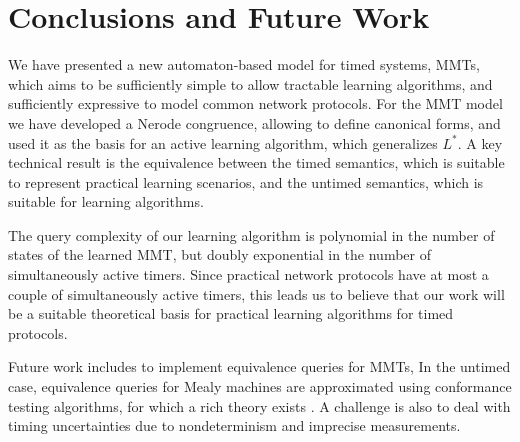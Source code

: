 
\section{Conclusions and Future Work}
\label{conclusions}

We have presented a new automaton-based model for timed systems, MMTs,
which aims to
be sufficiently simple to allow tractable learning algorithms, and sufficiently
expressive to model common network protocols. For the MMT model we have
developed a Nerode congruence, allowing to define canonical forms, and used it
as the basis for an active learning algorithm, which generalizes $L^*$.
A key technical result is the equivalence between the timed semantics,
which is suitable to represent practical learning scenarios, and the
untimed semantics, which is suitable for learning
algorithms.

The query complexity of our learning algorithm is polynomial in the number of
states of the learned MMT, but doubly exponential in the number of simultaneously
active timers. Since practical network protocols have at most a couple of
simultaneously active timers, this leads us to believe that our work will
be a suitable theoretical basis for practical learning algorithms for timed
protocols.

Future work includes to implement equivalence queries for MMTs,
In the untimed case, equivalence queries for Mealy machines are approximated using conformance testing algorithms,
for which a rich theory exists \cite{LeeY96}.
A challenge is also to deal with timing uncertainties due to nondeterminism  and imprecise measurements.

